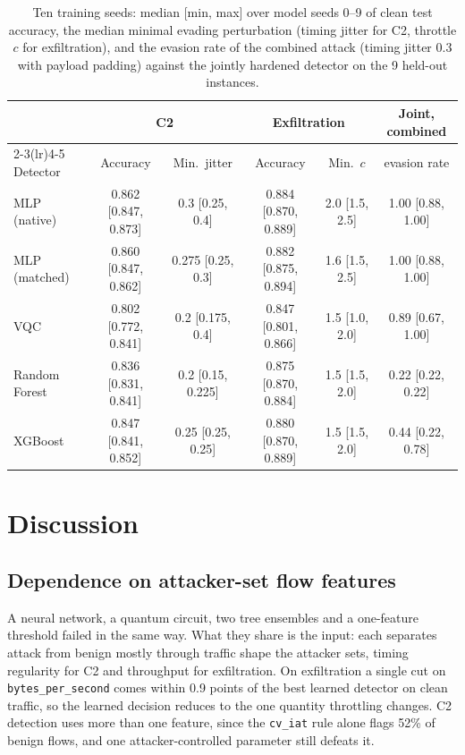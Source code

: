 \documentclass[preprint,12pt]{elsarticle}
\begin{document}
\begin{table}[htbp]
\centering
\caption{Ten training seeds: median [min, max] over model seeds 0--9 of clean test accuracy, the median
minimal evading perturbation (timing jitter for C2, throttle $c$ for exfiltration), and the evasion
rate of the combined attack (timing jitter $0.3$ with payload padding) against the jointly hardened
detector on the 9 held-out instances.}
\label{tab:seeds}
\setlength{\tabcolsep}{2.5pt}\scriptsize
\begin{tabular}{lccccc}
\toprule
 & \multicolumn{2}{c}{C2} & \multicolumn{2}{c}{Exfiltration} & Joint, combined \\
\cmidrule(lr){2-3}\cmidrule(lr){4-5}
Detector & Accuracy & Min.\ jitter & Accuracy & Min.\ $c$ & evasion rate \\
\midrule
MLP (native)  & 0.862 [0.847, 0.873] & 0.3 [0.25, 0.4]    & 0.884 [0.870, 0.889] & 2.0 [1.5, 2.5]  & 1.00 [0.88, 1.00] \\
MLP (matched) & 0.860 [0.847, 0.862] & 0.275 [0.25, 0.3]  & 0.882 [0.875, 0.894] & 1.6 [1.5, 2.5]  & 1.00 [0.88, 1.00] \\
VQC           & 0.802 [0.772, 0.841] & 0.2 [0.175, 0.4]   & 0.847 [0.801, 0.866] & 1.5 [1.0, 2.0]  & 0.89 [0.67, 1.00] \\
Random Forest & 0.836 [0.831, 0.841] & 0.2 [0.15, 0.225]  & 0.875 [0.870, 0.884] & 1.5 [1.5, 2.0]  & 0.22 [0.22, 0.22] \\
XGBoost       & 0.847 [0.841, 0.852] & 0.25 [0.25, 0.25]  & 0.880 [0.870, 0.889] & 1.5 [1.5, 2.0]  & 0.44 [0.22, 0.78] \\
\bottomrule
\end{tabular}
\end{table}

\section{Discussion}
\label{sec:discussion}

\subsection{Dependence on attacker-set flow features}
A neural network, a quantum circuit, two tree ensembles and a one-feature threshold failed in the same
way. What they share is the input: each separates attack from benign mostly through traffic shape the
attacker sets, timing regularity for C2 and throughput for exfiltration. On exfiltration a single cut on
\texttt{bytes\_per\_second} comes within 0.9 points of the best learned detector on clean traffic, so
the learned decision reduces to the one quantity throttling changes. C2 detection uses more than one
feature, since the \texttt{cv\_iat} rule alone flags 52\% of benign flows, and one attacker-controlled
parameter still defeats it.
\end{document}
